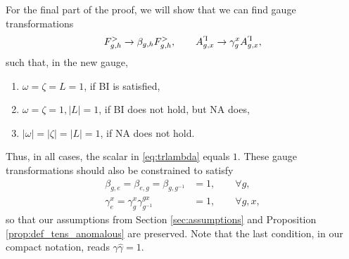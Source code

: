 \documentclass[reprint,
superscriptaddress,
amsmath,amssymb,
notitlepage,
aps,
prb,
10pt, 
tightenlines
]{revtex4-2}
\begin{document}
For the final part of the proof, we will show that we can find gauge transformations 
\begin{equation}
    F^>_{g,h}\to \beta_{g,h}F^>_{g,h},\qquad A^\ammaG_{g,x}\to \gamma^x_g A^\ammaG_{g,x}, 
\end{equation}
such that, in the new gauge,
\begin{enumerate}
    \item $\omega = \zeta = L = 1$, if BI is satisfied,
    \item $\omega = \zeta = 1,  |L| = 1$, if BI does not hold, but NA does,
    \item $|\omega| = |\zeta| = |L| = 1$, if NA does not hold.
\end{enumerate}
Thus, in all cases, the scalar in \eqref{eq:trlambda} equals $1$. These gauge transformations should also be constrained to satisfy
\begin{align}
    \beta_{g,e} = \beta_{e,g} = \beta_{g,g^{-1}} &= 1,\qquad \forall g,\label{eq:lig1}\\
    \gamma^x_{e} = \gamma^x_{g}\gamma^{gx}_{g^{-1}} &= 1,\qquad \forall g,x,\label{eq:lig2}
\end{align}
so that our assumptions from Section \ref{sec:assumptions} and Proposition \ref{prop:def_tens_anomalous} are preserved. Note that the last condition, in our compact notation, reads $\gamma\hat\gamma=1$.
\end{document}
